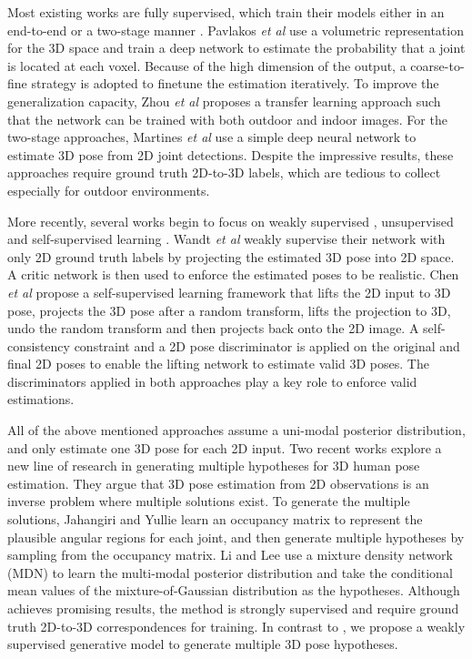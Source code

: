 \documentclass{bmvc2k}
\def\etal{\emph{et al}\bmvaOneDot}
\begin{document}
Most existing works are fully supervised, which train their models either in an end-to-end \cite{lee2018propagating, mehta2017monocular, pavlakos2017coarse, sun2018integral,zhou2017towards} or a two-stage manner \cite{bogo2016keep, martinez2017simple, rayat2018exploiting,moreno20173d, yasin2016dual}. Pavlakos \etal \cite{pavlakos2017coarse} use a volumetric representation for the 3D space and train a deep network to estimate the probability that a joint is located at each voxel. Because of the high dimension of the output, a coarse-to-fine strategy is adopted to finetune the estimation iteratively. To improve the generalization capacity, Zhou \etal \cite{zhou2017towards} proposes a transfer learning approach such that the network can be trained with both outdoor and indoor images. For the two-stage approaches, Martines \etal \cite{martinez2017simple}  use a simple deep neural network to estimate 3D pose from 2D joint detections. Despite the impressive results, these approaches require ground truth 2D-to-3D labels, which are tedious to collect especially for outdoor environments.

More recently, several works begin to focus on weakly supervised \cite{Wandt2019RepNet, tung2017adversarial, drover2018can}, unsupervised \cite{rhodin2018unsupervised} and self-supervised learning \cite{chen2019unsupervised}. Wandt \etal \cite{Wandt2019RepNet} weakly supervise their network with only 2D ground truth labels by projecting the estimated 3D pose into 2D space. A critic network is then used to enforce the estimated poses to be realistic.  Chen \etal \cite{chen2019unsupervised} propose a self-supervised learning framework that lifts the 2D input to 3D pose, projects the 3D pose after a random transform, lifts the projection to 3D, undo the random transform and then projects back onto the 2D image. A self-consistency constraint and a 2D pose discriminator is applied on the original and final 2D poses to enable the lifting network to estimate valid 3D poses. The discriminators applied in both approaches play a key role to enforce valid estimations.

All of the above mentioned approaches assume a uni-modal posterior distribution, and only estimate one 3D pose for each 2D input. Two recent works \cite{Li_2019_CVPR, jahangiri2017generating} explore a new line of research in generating multiple hypotheses for 3D human pose estimation. They argue that 3D pose estimation from 2D observations is an inverse problem where multiple solutions exist. To generate the multiple solutions, Jahangiri and Yullie \cite{jahangiri2017generating} learn an occupancy matrix to represent the plausible angular regions for each joint, and then generate multiple hypotheses by sampling from the occupancy matrix. Li and Lee \cite{Li_2019_CVPR} use a mixture density network (MDN) to learn the multi-modal posterior distribution and take the conditional mean values of the mixture-of-Gaussian distribution as the hypotheses. Although \cite{Li_2019_CVPR} achieves promising results, the method is strongly supervised and require ground truth 2D-to-3D correspondences for training. In contrast to \cite{Li_2019_CVPR, jahangiri2017generating}, we propose a weakly supervised generative model to generate multiple 3D pose hypotheses.
\end{document}
